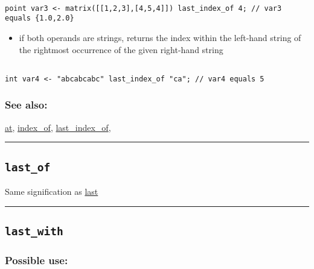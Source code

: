 \documentclass[]{book}
\providecommand{\tightlist}{%
  \setlength{\itemsep}{0pt}\setlength{\parskip}{0pt}}
\theoremstyle{definition}
\theoremstyle{definition}
\theoremstyle{definition}
\theoremstyle{remark}
\begin{document}
\begin{verbatim}
 
point var3 <- matrix([[1,2,3],[4,5,4]]) last_index_of 4; // var3 equals {1.0,2.0}
\end{verbatim}

\begin{itemize}
\tightlist
\item
  if both operands are strings, returns the index within the left-hand
  string of the rightmost occurrence of the given right-hand string
\end{itemize}

\begin{verbatim}
 
int var4 <- "abcabcabc" last_index_of "ca"; // var4 equals 5
\end{verbatim}

\subsubsection{See also:}\label{see-also-123}

\href{operators-a-to-a.html\#at}{at},
\href{operators-i-to-m.html\#index_of}{index\_of},
\href{operators-i-to-m.html\#last_index_of}{last\_index\_of},

\begin{center}\rule{0.5\linewidth}{\linethickness}\end{center}

\subsection{\texorpdfstring{\texttt{last\_of}}{last\_of}}\label{last_of}

Same signification as \href{operators-i-to-m.html\#last}{last}

\begin{center}\rule{0.5\linewidth}{\linethickness}\end{center}

\subsection{\texorpdfstring{\texttt{last\_with}}{last\_with}}\label{last_with}

\subsubsection{Possible use:}\label{possible-use-318}
\end{document}

